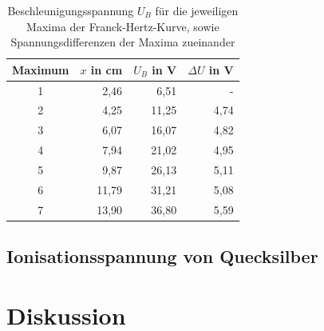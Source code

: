 \begin{table}[H]
 \begin{tabular}{c|r|r|r}
Maximum& $x$ in cm &	$U_B$ in V&	$\Delta U$ in V\\
\hline
1& 	2,46& 	6,51& -	\\
2& 	4,25	& 11,25&	4,74 \\
3& 	6,07&	16,07&	4,82\\
4& 	7,94&	21,02&	4,95\\
5& 	9,87&	26,13&	5,11\\
6& 	11,79&  31,21&	5,08\\
7& 	13,90& 	36,80&	5,59
 \end{tabular}
\caption{Beschleunigungsspannung $U_B$ für die jeweiligen Maxima der Franck-Hertz-Kurve, sowie Spannungsdifferenzen der Maxima zueinander}
\label{tab_franckhertz}
\end{table}

\subsection{Ionisationsspannung von Quecksilber}
\label{sec_ionisation}
\section{Diskussion}





